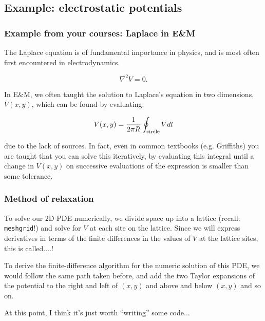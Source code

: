 \documentclass[hyperref={colorlinks=true}]{beamer}
\begin{document}
\subsection[Example: electrostatic potentials]{Example: electrostatic potentials}

\begin{frame}%
  \frametitle{Example from your courses: Laplace in E\&M}

  The Laplace equation is of fundamental importance in physics, and is most often first encountered in electrodynamics.

  \begin{equation}
    \nabla^{2} V = 0.
  \end{equation}

  In E\&M, we often taught the solution to Laplace's equation in two dimensions, $V(x,y)$, which can be found by evaluating:

  \begin{equation}
    V(x,y) = \frac{1}{2\pi R} \oint_{\rm circle} V dl
  \end{equation}
  
  due to the lack of sources. In fact, even in common textbooks (e.g. Griffiths) you are taught that you can solve this iteratively, by evaluating this integral until a change in $V(x,y)$ on successive evaluations of the expression is smaller than some tolerance. 
  
\end{frame}


\begin{frame}%
  \frametitle{Method of relaxation}

  To solve our 2D PDE numerically, we divide space up into a lattice (recall: \texttt{meshgrid}!) and solve for $V$ at each site on the lattice. Since we will express derivatives in terms of the finite differences in the values of $V$ at the lattice sites, this is called....\pause {}!
  
  \pause
  
  \mysp
  
  To derive the finite-difference algorithm for the numeric solution of this PDE, we would follow the same path taken before, and add the two Taylor expansions of the potential to the right and left of $(x, y)$ and above and below $(x, y)$ and so on.  
  
  \mysp
  
  At this point, I think it's just worth ``writing'' some code...
  
\end{frame}

\end{document}
